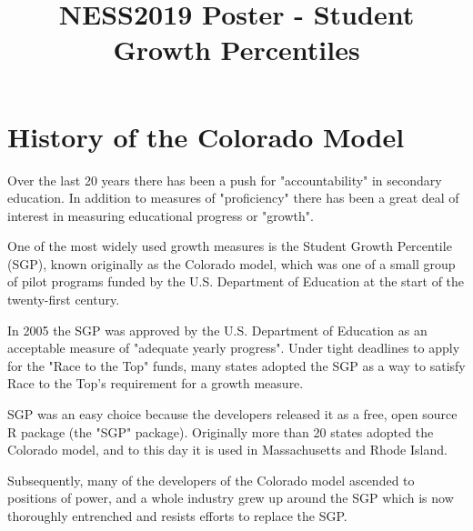 \documentclass{amsart}
\begin{document}
\title{NESS2019 Poster - Student Growth Percentiles}
\maketitle
\par\vspace{0.4 cm}\noindent
\section*{History of the Colorado Model}
Over the last 20 years there has been a push for "accountability" in secondary education.  In addition to measures of "proficiency" there has been a great deal of interest in measuring educational progress or "growth".
\par\vspace{0.4 cm}
One of the most widely used growth measures is the Student Growth Percentile (SGP), known originally as the Colorado model, which was one of a small group of pilot programs funded by the U.S. Department of Education at the start of the twenty-first century.  
\par\vspace{0.4 cm}
In 2005 the SGP was approved by the U.S. Department of Education as an acceptable measure of "adequate yearly progress".  Under tight deadlines to apply for the "Race to the Top" funds, many states adopted the SGP as a way to satisfy Race to the Top's requirement for a growth measure.  
\par\vspace{0.4 cm}
SGP was an easy choice because the developers released it as a free, open source R package (the "SGP" package).  Originally more than 20 states adopted the Colorado model, and to this day it is used in Massachusetts and Rhode Island.
\par\vspace{0.4 cm}
Subsequently, many of the developers of the Colorado model ascended to positions of power, and a whole industry grew up around the SGP which is now thoroughly entrenched and resists efforts to replace the SGP.
\end{document}
